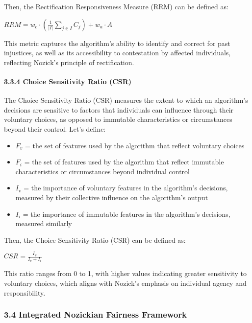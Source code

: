 Then, the Rectification Responsiveness Measure (RRM) can be defined as:

\(RRM = w_c \cdot \left(\frac{1}{|I|} \sum_{j \in I} C_j\right) + w_a \cdot A\)

This metric captures the algorithm's ability to identify and correct for
past injustices, as well as its accessibility to contestation by
affected individuals, reflecting Nozick's principle of rectification.

\paragraph{3.3.4 Choice Sensitivity Ratio
(CSR)}\label{choice-sensitivity-ratio-csr}

The Choice Sensitivity Ratio (CSR) measures the extent to which an
algorithm's decisions are sensitive to factors that individuals can
influence through their voluntary choices, as opposed to immutable
characteristics or circumstances beyond their control. Let's define:

\begin{itemize}
\tightlist
\item
  \(F_v\) = the set of features used by the algorithm that reflect
  voluntary choices
\item
  \(F_i\) = the set of features used by the algorithm that reflect
  immutable characteristics or circumstances beyond individual control
\item
  \(I_v\) = the importance of voluntary features in the algorithm's
  decisions, measured by their collective influence on the algorithm's
  output
\item
  \(I_i\) = the importance of immutable features in the algorithm's
  decisions, measured similarly
\end{itemize}

Then, the Choice Sensitivity Ratio (CSR) can be defined as:

\(CSR = \frac{I_v}{I_v + I_i}\)

This ratio ranges from 0 to 1, with higher values indicating greater
sensitivity to voluntary choices, which aligns with Nozick's emphasis on
individual agency and responsibility.

\subsubsection{3.4 Integrated Nozickian Fairness
Framework}\label{integrated-nozickian-fairness-framework}

